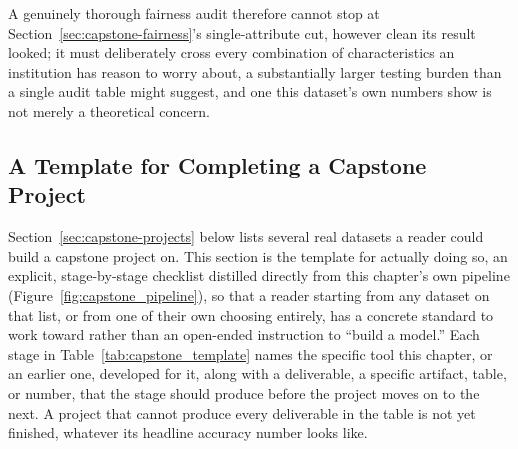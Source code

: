 \documentclass[../ai_in_finance]{subfiles}
\begin{document}
A genuinely thorough fairness audit therefore cannot stop at Section~\ref{sec:capstone-fairness}'s single-attribute cut, however clean its result looked; it must deliberately cross every combination of characteristics an institution has reason to worry about, a substantially larger testing burden than a single audit table might suggest, and one this dataset's own numbers show is not merely a theoretical concern.

\subsection{A Template for Completing a Capstone Project}
\label{sec:capstone-template}

Section~\ref{sec:capstone-projects} below lists several real datasets a reader could build a capstone project on. This section is the template for actually doing so, an explicit, stage-by-stage checklist distilled directly from this chapter's own pipeline (Figure~\ref{fig:capstone_pipeline}), so that a reader starting from any dataset on that list, or from one of their own choosing entirely, has a concrete standard to work toward rather than an open-ended instruction to ``build a model.'' Each stage in Table~\ref{tab:capstone_template} names the specific tool this chapter, or an earlier one, developed for it, along with a deliverable, a specific artifact, table, or number, that the stage should produce before the project moves on to the next. A project that cannot produce every deliverable in the table is not yet finished, whatever its headline accuracy number looks like.
\end{document}
